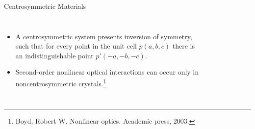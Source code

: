 \documentclass{beamer}
\begin{document}
\begin{frame}

\vspace{-0.2cm}

\noindent\makebox[\linewidth]{\rule{\linewidth}{0.4pt}}

\vspace{-2.0mm}
\begin{center}
{\large Centrosymmetric Materials}
\end{center}

\vspace{-5mm}
\noindent\makebox[\linewidth]{\rule{\linewidth}{0.4pt}}

\begin{columns}


{
\small

\vspace{-4mm}
\begin{itemize}

\item 
A centrosymmetric system presents inversion of symmetry, such that for every
point in the unit cell $p(a, b, c)$ there is an indistinguishable point $p'(-a,
-b, -c)$.

\item 
Second-order nonlinear optical interactions can occur only in
noncentrosymmetric crystals.\footnote[frame]{\tiny Boyd, Robert W. Nonlinear optics. Academic press, 2003.}

\end{itemize}
}


\begin{figure}[h!]
\vspace{-4mm}
\begin{tikzpicture}


\end{tikzpicture}
\end{figure}
\end{columns}
\end{frame}
\end{document}
